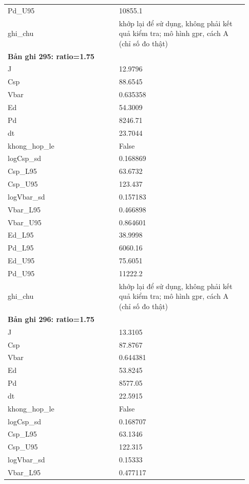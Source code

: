 \begin{longtable}{p{0.43\linewidth}p{0.50\linewidth}}
Pd\_\allowbreak U95 & 10855.1 \\
ghi\_\allowbreak chu & khớp lại để sử dụng, không phải kết quả kiểm tra; mô hình gpr, cách A (chỉ số đo thật) \\
\midrule
\multicolumn{2}{p{0.95\linewidth}}{\textbf{Bản ghi 295: ratio=1.75}} \\
J & 12.9796 \\
Csp & 88.6545 \\
Vbar & 0.635358 \\
Ed & 54.3009 \\
Pd & 8246.71 \\
dt & 23.7044 \\
khong\_\allowbreak hop\_\allowbreak le & False \\
logCsp\_\allowbreak sd & 0.168869 \\
Csp\_\allowbreak L95 & 63.6732 \\
Csp\_\allowbreak U95 & 123.437 \\
logVbar\_\allowbreak sd & 0.157183 \\
Vbar\_\allowbreak L95 & 0.466898 \\
Vbar\_\allowbreak U95 & 0.864601 \\
Ed\_\allowbreak L95 & 38.9998 \\
Pd\_\allowbreak L95 & 6060.16 \\
Ed\_\allowbreak U95 & 75.6051 \\
Pd\_\allowbreak U95 & 11222.2 \\
ghi\_\allowbreak chu & khớp lại để sử dụng, không phải kết quả kiểm tra; mô hình gpr, cách A (chỉ số đo thật) \\
\midrule
\multicolumn{2}{p{0.95\linewidth}}{\textbf{Bản ghi 296: ratio=1.75}} \\
J & 13.3105 \\
Csp & 87.8767 \\
Vbar & 0.644381 \\
Ed & 53.8245 \\
Pd & 8577.05 \\
dt & 22.5915 \\
khong\_\allowbreak hop\_\allowbreak le & False \\
logCsp\_\allowbreak sd & 0.168707 \\
Csp\_\allowbreak L95 & 63.1346 \\
Csp\_\allowbreak U95 & 122.315 \\
logVbar\_\allowbreak sd & 0.15333 \\
Vbar\_\allowbreak L95 & 0.477117 \\

\end{longtable}
